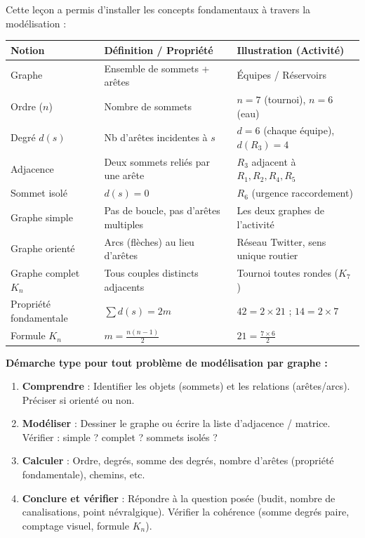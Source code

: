 \documentclass[11pt]{article}
\newcounter{popsec}
\newcounter{popsub}
\newcommand{\courssub}[1]{%
  \stepcounter{popsub}%
  \par\vspace{9pt}\noindent{\popxbold\fontsize{11.5}{13}\selectfont\color{popink}{\color{poporange}\thepopsec.\thepopsub}\hspace{6pt}#1}\par\nopagebreak\vspace{4pt}
}
\begin{document}
\courssub{Bilan et synthèse}

Cette leçon a permis d'installer les concepts fondamentaux à travers la modélisation :

\begin{center}
\begin{tabularx}{\linewidth}{|l|X|X|}
\hline
\rowcolor{popblueL} \textbf{Notion} & \textbf{Définition / Propriété} & \textbf{Illustration (Activité)} \\
\hline
Graphe & Ensemble de sommets + arêtes & Équipes / Réservoirs \\
\hline
Ordre ($n$) & Nombre de sommets & $n=7$ (tournoi), $n=6$ (eau) \\
\hline
Degré $d(s)$ & Nb d'arêtes incidentes à $s$ & $d=6$ (chaque équipe), $d(R_3)=4$ \\
\hline
Adjacence & Deux sommets reliés par une arête & $R_3$ adjacent à $R_1,R_2,R_4,R_5$ \\
\hline
Sommet isolé & $d(s)=0$ & $R_6$ (urgence raccordement) \\
\hline
Graphe simple & Pas de boucle, pas d'arêtes multiples & Les deux graphes de l'activité \\
\hline
Graphe orienté & Arcs (flèches) au lieu d'arêtes & Réseau Twitter, sens unique routier \\
\hline
Graphe complet $K_n$ & Tous couples distincts adjacents & Tournoi toutes rondes ($K_7$) \\
\hline
Propriété fondamentale & $\sum d(s) = 2m$ & $42=2\times21$ ; $14=2\times7$ \\
\hline
Formule $K_n$ & $m = \frac{n(n-1)}{2}$ & $21 = \frac{7\times6}{2}$ \\
\hline
\end{tabularx}
\end{center}

\vspace{0.5em}
\noindent \textbf{Démarche type pour tout problème de modélisation par graphe :}
\begin{enumerate}
\item \textbf{Comprendre} : Identifier les objets (sommets) et les relations (arêtes/arcs). Préciser si orienté ou non.
\item \textbf{Modéliser} : Dessiner le graphe ou écrire la liste d'adjacence / matrice. Vérifier : simple ? complet ? sommets isolés ?
\item \textbf{Calculer} : Ordre, degrés, somme des degrés, nombre d'arêtes (propriété fondamentale), chemins, etc.
\item \textbf{Conclure et vérifier} : Répondre à la question posée (budit, nombre de canalisations, point névralgique). Vérifier la cohérence (somme degrés paire, comptage visuel, formule $K_n$).
\end{enumerate}
\end{document}
